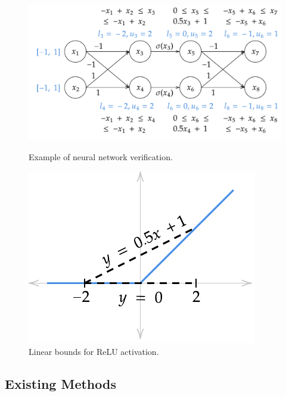 \begin{figure}[t]
	\centering
	\begin{minipage}{.63\textwidth}
		\centering
		\includegraphics[width=\linewidth]{onlinesyn/figs/motex.pdf}
		\caption{Example of neural network verification.}
		\label{onlinesyn:fig:motex}
	\end{minipage}\hspace{24pt}%
	\begin{minipage}{.27\textwidth}
		\centering
		\includegraphics[width=\linewidth]{onlinesyn/figs/relu_relax.pdf}
		\caption{Linear bounds for ReLU activation.}
		\label{onlinesyn:fig:linearbound}
	\end{minipage}
\end{figure}


\subsection{Existing Methods}

